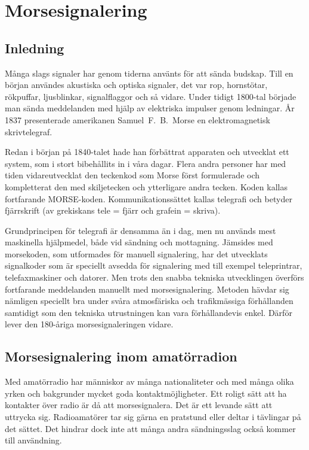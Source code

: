 \chapter{Morsesignalering}

\section{Inledning}

Många slags signaler har genom tiderna använts för att sända budskap.
Till en början användes akustiska och optiska signaler, det var rop, hornstötar,
rökpuffar, ljusblinkar, signalflaggor och så vidare.
Under tidigt 1800-tal började man sända meddelanden med hjälp av elektriska
impulser genom ledningar.
År 1837 presenterade amerikanen Samuel~F.~B.~Morse en elektromagnetisk
skrivtelegraf.

Redan i början på 1840-talet hade han förbättrat apparaten och utvecklat ett
system, som i stort bibehållits in i våra dagar.
Flera andra personer har med tiden vidareutvecklat den teckenkod som Morse
först formulerade och kompletterat den med skiljetecken och ytterligare andra
tecken.
Koden kallas fortfarande MORSE-koden.
Kommunikationssättet kallas telegrafi och betyder fjärrskrift (av grekiskans
tele = fjärr och grafein = skriva).

Grundprincipen för telegrafi är densamma än i dag, men nu används mest
maskinella hjälpmedel, både vid sändning och mottagning.
Jämsides med morsekoden, som utformades för manuell signalering, har det
utvecklats signalkoder som är speciellt avsedda för signalering med till exempel
teleprintrar, telefaxmaskiner och datorer.
Men trots den snabba tekniska utvecklingen överförs fortfarande meddelanden
manuellt med morsesignalering.
Metoden hävdar sig nämligen speciellt bra under svåra atmosfäriska och
trafikmässiga förhållanden samtidigt som den tekniska utrustningen kan vara
förhållandevis enkel.
Därför lever den 180-åriga morsesignaleringen vidare.

\section[Morsesignalering]{Morsesignalering inom amatörradion}

Med amatörradio har människor av många nationaliteter och med många olika yrken
och bakgrunder mycket goda kontaktmöjligheter.
Ett roligt sätt att ha kontakter över radio är då att morsesignalera.
Det är ett levande sätt att uttrycka sig.
Radioamatörer tar sig gärna en pratstund eller deltar i tävlingar på det sättet.
Det hindrar dock inte att många andra sändningsslag också kommer till
användning.

